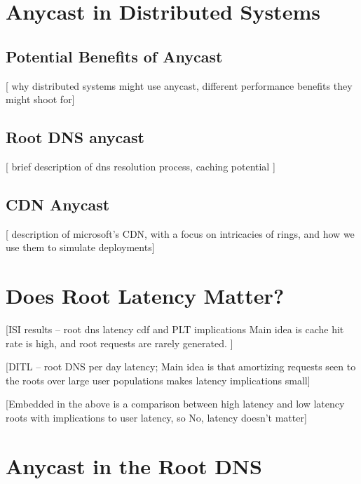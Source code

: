 \documentclass[sigconf,nonacm,10pt]{acmart}
\begin{document}
\section{Anycast in Distributed
Systems}\label{anycast-in-distributed-systems}

\label{sec:anycast_distributed_systems}

\subsection{Potential Benefits of
Anycast}\label{potential-benefits-of-anycast}

{[} why distributed systems might use anycast, different performance
benefits they might shoot for{]}

\subsection{Root DNS anycast}\label{root-dns-anycast}

{[} brief description of dns resolution process, caching potential {]}

\subsection{CDN Anycast}\label{cdn-anycast}

{[} description of microsoft's CDN, with a focus on intricacies of
rings, and how we use them to simulate deployments{]}

\section{Does Root Latency Matter?}\label{does-root-latency-matter}

\label{sec:root_dns_latency}

{[}ISI results -- root dns latency cdf and PLT implications Main idea is
cache hit rate is high, and root requests are rarely generated. {]}

{[}DITL -- root DNS per day latency; Main idea is that amortizing
requests seen to the roots over large user populations makes latency
implications small{]}

{[}Embedded in the above is a comparison between high latency and low
latency roots with implications to user latency, so No, latency doesn't
matter{]}

\section{Anycast in the Root DNS}\label{anycast-in-the-root-dns}
\end{document}

